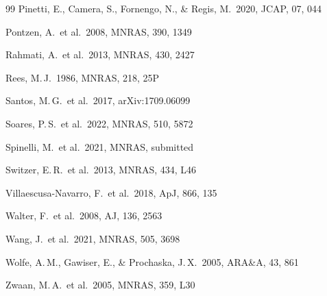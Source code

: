 \documentclass[10pt,a4paper]{article}
\begin{document}
\begin{thebibliography}{99}
Pinetti, E., Camera, S., Fornengo, N., \& Regis, M.\ 2020, JCAP, 07, 044

Pontzen, A.\ et al.\ 2008, MNRAS, 390, 1349

Rahmati, A.\ et al.\ 2013, MNRAS, 430, 2427

Rees, M.\,J.\ 1986, MNRAS, 218, 25P

Santos, M.\,G.\ et al.\ 2017, arXiv:1709.06099

Soares, P.\,S.\ et al.\ 2022, MNRAS, 510, 5872

Spinelli, M.\ et al.\ 2021, MNRAS, submitted

Switzer, E.\,R.\ et al.\ 2013, MNRAS, 434, L46

Villaescusa-Navarro, F.\ et al.\ 2018, ApJ, 866, 135

Walter, F.\ et al.\ 2008, AJ, 136, 2563

Wang, J.\ et al.\ 2021, MNRAS, 505, 3698

Wolfe, A.\,M., Gawiser, E., \& Prochaska, J.\,X.\ 2005, ARA\&A, 43, 861

Zwaan, M.\,A.\ et al.\ 2005, MNRAS, 359, L30

\end{thebibliography}
\end{document}
